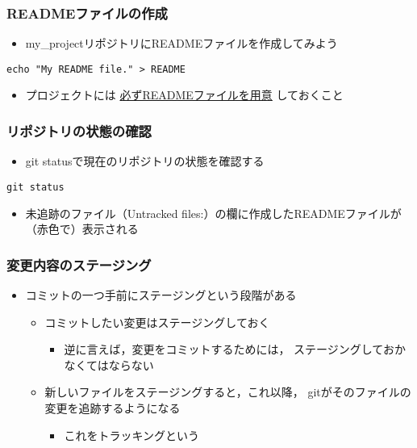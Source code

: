 \documentclass[a4paper,twoside,twocolumn]{bxjsarticle}
\begin{document}
\subsubsection{READMEファイルの作成}
\label{sec-1-3-2}
\begin{itemize}
\item my\_projectリポジトリにREADMEファイルを作成してみよう
\end{itemize}

\begin{verbatim}
echo "My README file." > README
\end{verbatim}

\begin{itemize}
\item プロジェクトには \uline{必ずREADMEファイルを用意} しておくこと
\end{itemize}

\subsubsection{リポジトリの状態の確認}
\label{sec-1-3-3}
\begin{itemize}
\item git statusで現在のリポジトリの状態を確認する
\end{itemize}

\begin{verbatim}
git status
\end{verbatim}

\begin{itemize}
\item 未追跡のファイル（Untracked files:）の欄に作成したREADMEファイルが
（赤色で）表示される
\end{itemize}

\subsubsection{変更内容のステージング}
\label{sec-1-3-4}
\begin{itemize}
\item コミットの一つ手前にステージングという段階がある
\begin{itemize}
\item コミットしたい変更はステージングしておく
\begin{itemize}
\item 逆に言えば，変更をコミットするためには，
ステージングしておかなくてはならない
\end{itemize}
\item 新しいファイルをステージングすると，これ以降，
gitがそのファイルの変更を追跡するようになる
\begin{itemize}
\item これをトラッキングという
\end{itemize}
\end{itemize}
\end{itemize}
\end{document}
